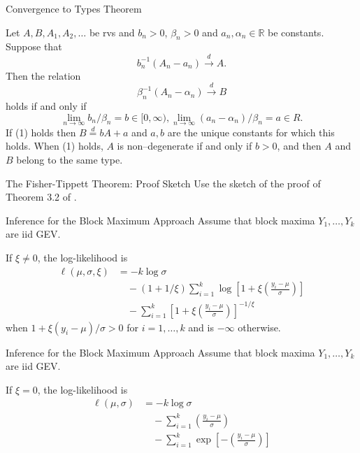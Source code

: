 \documentclass{beamer}
\begin{document}
\begin{frame}{Convergence to Types Theorem}
    \begin{theorem}
        Let $A, B, A_1, A_2, \ldots$ be rvs and $b_n > 0$, $\beta_n > 0$ and $a_n, \alpha_n \in \mathbb{R}$ be constants. Suppose that
        \[
        b_n^{-1}(A_n - a_n) \xrightarrow{d} A.
        \]
        Then the relation
        \[
        \beta_n^{-1}(A_n - \alpha_n) \xrightarrow{d} B \tag{1}
        \]
        holds if and only if
        \[
        \lim_{n \to \infty} b_n / \beta_n = b \in [0, \infty), \lim_{n \to \infty} (a_n - \alpha_n) / \beta_n = a \in R. \tag{2}
        \]
        If (1) holds then $B \overset{d}{=} b A + a$ and $a, b$ are the unique constants for which this holds. When (1) holds, $A$ is non–degenerate if and only if $b > 0$, and then $A$ and $B$ belong to the same type.
    \end{theorem}
\end{frame}

\begin{frame}{The Fisher-Tippett Theorem: Proof Sketch}
    Use the sketch of the proof of Theorem 3.2 of \cite{coles_2001}.
\end{frame}

\begin{frame}{Inference for the Block Maximum Approach}
    Assume that block maxima $Y_1, \ldots, Y_k$ are iid GEV.

    \medskip
    
    If $\xi \ne 0$, the log-likelihood is
    \begin{align*}
        \ell(\mu, \sigma, \xi) &= -k\log\sigma \\
        &\quad - (1 + 1 / \xi)\sum_{i = 1}^k \log\left[1 + \xi\left(\frac{y_i - \mu}{\sigma}\right)\right] \\
        &\quad - \sum_{i = 1}^k \left[1 + \xi\left(\frac{y_i - \mu}{\sigma}\right)\right]^{-1 / \xi}
    \end{align*}
    when $1 + \xi(y_i - \mu) / \sigma > 0$ for $i = 1, \ldots, k$ and is $-\infty$ otherwise.
\end{frame}

\begin{frame}{Inference for the Block Maximum Approach}
    Assume that block maxima $Y_1, \ldots, Y_k$ are iid GEV.

    \medskip
    
    If $\xi = 0$, the log-likelihood is
    \begin{align*}
        \ell(\mu, \sigma) &= -k\log\sigma \\
        &\quad - \sum_{i = 1}^k \left(\frac{y_i - \mu}{\sigma}\right) \\
        &\quad - \sum_{i = 1}^k \exp\left[-\left(\frac{y_i - \mu}{\sigma}\right)\right]
    \end{align*}
\end{frame}
\end{document}
